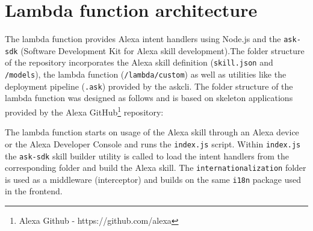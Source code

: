 \section{Lambda function architecture} \label{lambda}

The lambda function provides Alexa intent handlers using Node.js and the \texttt{ask-sdk} (Software Development Kit for Alexa skill development).The folder structure of the repository incorporates the Alexa skill definition (\texttt{skill.json} and \texttt{/models}), the lambda function (\texttt{/lambda/custom}) as well as utilities like the deployment pipeline (\texttt{.ask}) provided by the \gls{askcli}. The folder structure of the lambda function was designed as follows and is based on skeleton applications provided by the Alexa GitHub\footnote{Alexa Github - https://github.com/alexa} repository: \vspace{1em}


The lambda function starts on usage of the Alexa skill through an Alexa device or the Alexa Developer Console and runs the \texttt{index.js} script. Within \texttt{index.js} the \texttt{ask-sdk} skill builder utility is called to load the intent handlers from the corresponding folder and build the Alexa skill. The \texttt{internationalization} folder is used as a middleware (interceptor) and builds on the same \texttt{i18n} package used in the frontend. 

